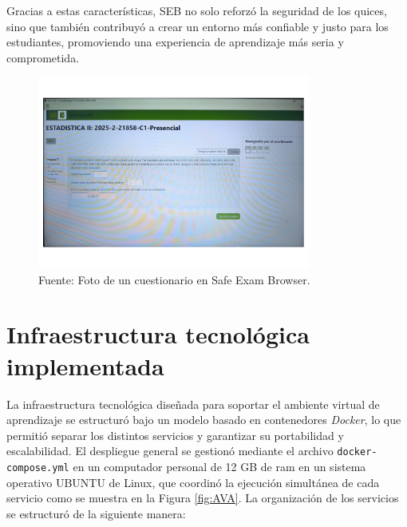 \documentclass[letter,oneside,12pt,spanish]{report}
\begin{document}
Gracias a estas características, SEB no solo reforzó la seguridad de los quices, sino que también contribuyó a crear un entorno más confiable y justo para los estudiantes, promoviendo una experiencia de aprendizaje más seria y comprometida.

\begin{figure}[ht]
	\centering
	\includegraphics[width=0.8\textwidth]{Figs/SEB.pdf}
	\label{fig:SEB}
	\\Fuente: Foto de un cuestionario en Safe Exam Browser.
\end{figure}

\section{Infraestructura tecnológica implementada}

La infraestructura tecnológica diseñada para soportar el ambiente virtual de aprendizaje se estructuró bajo un modelo basado en contenedores \textit{Docker}, lo que permitió separar los distintos servicios y garantizar su portabilidad y escalabilidad. El despliegue general se gestionó mediante el archivo \texttt{docker-compose.yml} en un computador personal de 12 GB de ram en un sistema operativo UBUNTU de Linux, que coordinó la ejecución simultánea de cada servicio como se muestra en la Figura \ref{fig:AVA}. La organización de los servicios se estructuró de la siguiente manera:
\end{document}
